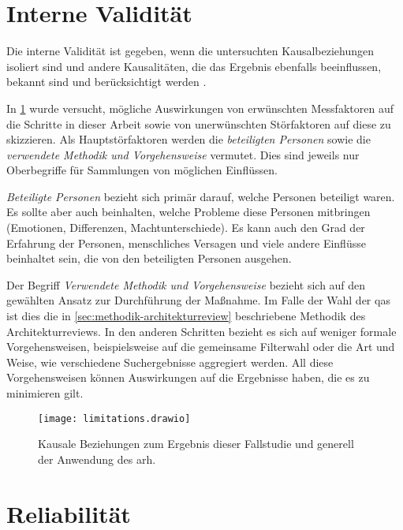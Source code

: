 \section{Interne Validität}

Die interne Validität ist gegeben, wenn die untersuchten Kausalbeziehungen isoliert sind und andere Kausalitäten, die das Ergebnis ebenfalls beeinflussen, bekannt sind und berücksichtigt werden \cite{Runeson2009}.

In \cref{fig:limitations} wurde versucht, mögliche Auswirkungen von erwünschten Messfaktoren auf die Schritte in dieser Arbeit sowie von unerwünschten Störfaktoren auf diese zu skizzieren.
Als Hauptstörfaktoren werden die \emph{beteiligten Personen} sowie die \emph{verwendete Methodik und Vorgehensweise} vermutet. 
Dies sind jeweils nur Oberbegriffe für Sammlungen von möglichen Einflüssen.

\emph{Beteiligte Personen} bezieht sich primär darauf, welche Personen beteiligt waren.
Es sollte aber auch beinhalten, welche Probleme diese Personen mitbringen (Emotionen, Differenzen, Machtunterschiede).
Es kann auch den Grad der Erfahrung der Personen, menschliches Versagen und viele andere Einflüsse beinhaltet sein, die von den beteiligten Personen ausgehen.

Der Begriff \emph{Verwendete Methodik und Vorgehensweise} bezieht sich auf den gewählten Ansatz zur Durchführung der Maßnahme.
Im Falle der Wahl der \glspl{qa} ist dies die in \cref{sec:methodik-architekturreview} beschriebene Methodik des Architekturreviews.
In den anderen Schritten bezieht es sich auf weniger formale Vorgehensweisen, beispielsweise auf die gemeinsame Filterwahl oder die Art und Weise, wie verschiedene Suchergebnisse aggregiert werden.
All diese Vorgehensweisen können Auswirkungen auf die Ergebnisse haben, die es zu minimieren gilt. 

\begin{figure}
	\centering
	\texttt{[image: limitations.drawio]}
	\caption[Kausale Beziehungen Fallstudie]{
			Kausale Beziehungen zum Ergebnis dieser Fallstudie und generell der Anwendung des \gls{arh}.
		}
	\label{fig:limitations}
\end{figure}

\section{Reliabilität}

